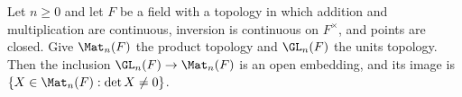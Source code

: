 Let $n\ge0$ and let $F$ be a field with a topology in which addition and multiplication are continuous, inversion is continuous on $F^\times$, and points are closed. Give $\Mat_n(F)$ the product topology and $\GL_n(F)$ the units topology. Then the inclusion $\GL_n(F)\to\Mat_n(F)$ is an open embedding, and its image is $\{X\in\Mat_n(F):\det X\neq0\}$.
